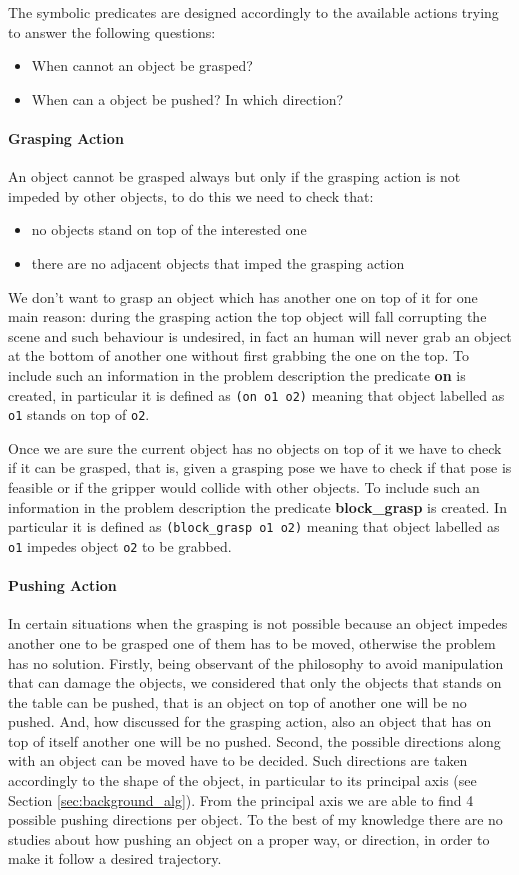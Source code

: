 The symbolic predicates are designed accordingly to the available actions trying to answer the following questions:
\begin{itemize}
\item When cannot an object be grasped? 
\item When can a object be pushed? In which direction? 
\end{itemize}

\paragraph{Grasping Action}
An object cannot be grasped always but only if the grasping action is not impeded by other objects, to do this we need to check that:
\begin{itemize}
\item no objects stand on top of the interested one
\item there are no adjacent objects that imped the grasping action
\end{itemize}
We don't want to grasp an object which has another one on top of it for one main reason: during the grasping action the top object will fall corrupting the scene and such behaviour is undesired, in fact an human will never grab an object at the bottom of another one without first grabbing the one on the top. To include such an information in the problem description the predicate \textbf{on} is created, in particular it is defined as \texttt{(on o1 o2)} meaning that object labelled as \texttt{o1} stands on top of \texttt{o2}.

Once we are sure the current object has no objects on top of it we have to check if it can be grasped, that is, given a grasping pose we have to check if that pose is feasible or if the gripper would collide with other objects. To include such an information in the problem description the predicate \textbf{block\_grasp} is created. In particular it is defined as \texttt{(block\_grasp o1 o2)} meaning that object labelled as \texttt{o1} impedes object \texttt{o2} to be grabbed.

\paragraph{Pushing Action}
In certain situations when the grasping is not possible because an object impedes another one to be grasped one of them has to be moved, otherwise the problem has no solution. Firstly, being observant of the philosophy to avoid manipulation that can damage the objects, we considered that only the objects that stands on the table can be pushed, that is an object on top of another one will be no pushed. And, how discussed for the grasping action, also an object that has on top of itself another one will be no pushed.
Second, the possible directions along with an object can be moved have to be decided. Such directions are taken accordingly to the shape of the object, in particular to its principal axis (see Section \ref{sec:background_alg}). From the principal axis we are able to find 4 possible pushing directions per object. To the best of my knowledge there are no studies about how pushing an object on a proper way, or direction, in order to make it follow a desired trajectory. 

